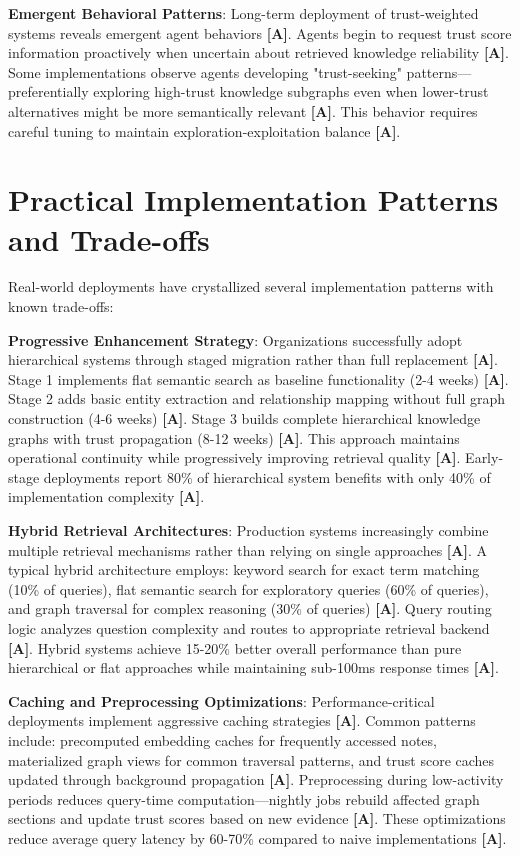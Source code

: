 \documentclass[a4paper,11pt]{article}
\newcommand{\alabel}{\textbf{\textcolor{acolor}{[A]}}}
\begin{document}
\textbf{Emergent Behavioral Patterns}: Long-term deployment of trust-weighted systems reveals emergent agent behaviors \alabel{}. Agents begin to request trust score information proactively when uncertain about retrieved knowledge reliability \alabel{}. Some implementations observe agents developing "trust-seeking" patterns—preferentially exploring high-trust knowledge subgraphs even when lower-trust alternatives might be more semantically relevant \alabel{}. This behavior requires careful tuning to maintain exploration-exploitation balance \alabel{}.


\section{Practical Implementation Patterns and Trade-offs}

Real-world deployments have crystallized several implementation patterns with known trade-offs:


\textbf{Progressive Enhancement Strategy}: Organizations successfully adopt hierarchical systems through staged migration rather than full replacement \alabel{}. Stage 1 implements flat semantic search as baseline functionality (2-4 weeks) \alabel{}. Stage 2 adds basic entity extraction and relationship mapping without full graph construction (4-6 weeks) \alabel{}. Stage 3 builds complete hierarchical knowledge graphs with trust propagation (8-12 weeks) \alabel{}. This approach maintains operational continuity while progressively improving retrieval quality \alabel{}. Early-stage deployments report 80\% of hierarchical system benefits with only 40\% of implementation complexity \alabel{}.


\textbf{Hybrid Retrieval Architectures}: Production systems increasingly combine multiple retrieval mechanisms rather than relying on single approaches \alabel{}. A typical hybrid architecture employs: keyword search for exact term matching (10\% of queries), flat semantic search for exploratory queries (60\% of queries), and graph traversal for complex reasoning (30\% of queries) \alabel{}. Query routing logic analyzes question complexity and routes to appropriate retrieval backend \alabel{}. Hybrid systems achieve 15-20\% better overall performance than pure hierarchical or flat approaches while maintaining sub-100ms response times \alabel{}.


\textbf{Caching and Preprocessing Optimizations}: Performance-critical deployments implement aggressive caching strategies \alabel{}. Common patterns include: precomputed embedding caches for frequently accessed notes, materialized graph views for common traversal patterns, and trust score caches updated through background propagation \alabel{}. Preprocessing during low-activity periods reduces query-time computation—nightly jobs rebuild affected graph sections and update trust scores based on new evidence \alabel{}. These optimizations reduce average query latency by 60-70\% compared to naive implementations \alabel{}.
\end{document}
